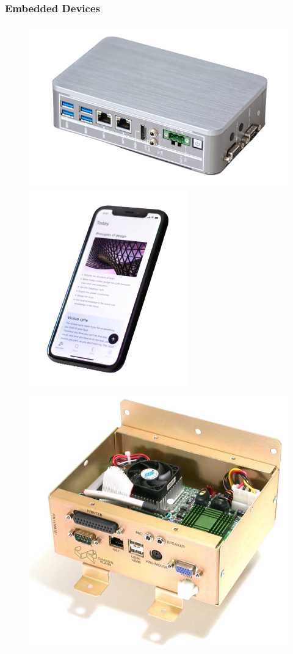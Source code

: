 \documentclass{beamer}
\begin{document}
\begin{frame}
  \frametitle{Embedded Devices}

  \begin{figure}
    \centering
    \includegraphics[scale=0.21]{images/edge-pc}
    \hspace{2em}
    \includegraphics[scale=0.27]{images/smart-phone}
    \includegraphics[scale=0.07]{images/accupoll-embedded-computer}\hspace{2em}

\end{figure}
\end{frame}
\end{document}
